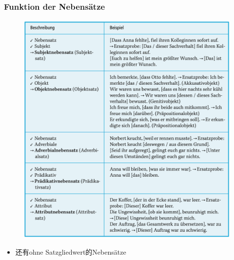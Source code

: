 \documentclass[UTF8]{report}
\begin{document}
\subsubsection{Funktion der Nebensätze}
\begin{figure}[H]
    \centering
    \includegraphics[scale=0.6]{fs.png}
\end{figure}
\begin{itemize}
    \item 还有ohne Satzgliedwert的Nebensätze
\end{itemize}
\end{document}
